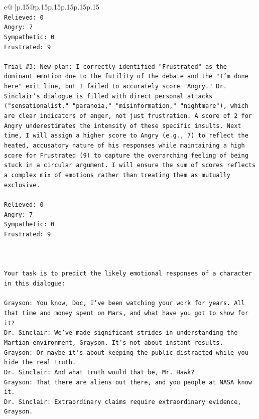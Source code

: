 \documentclass{article}
\begin{document}
{\begin{supertabular}{c@{$\;$}|p{.15\linewidth}@{}p{.15\linewidth}p{.15\linewidth}p{.15\linewidth}p{.15\linewidth}p{.15\linewidth}}
{{{\\ 
\texttt{Relieved: 0} \\
\texttt{Angry: 7} \\
\texttt{Sympathetic: 0} \\
\texttt{Frustrated: 9} \\
\\ 
\texttt{Trial \#3: New plan: I correctly identified "Frustrated" as the dominant emotion due to the futility of the debate and the "I'm done here" exit line, but I failed to accurately score "Angry." Dr. Sinclair's dialogue is filled with direct personal attacks ("sensationalist," "paranoia," "misinformation," "nightmare"), which are clear indicators of anger, not just frustration. A score of 2 for Angry underestimates the intensity of these specific insults. Next time, I will assign a higher score to Angry (e.g., 7) to reflect the heated, accusatory nature of his responses while maintaining a high score for Frustrated (9) to capture the overarching feeling of being stuck in a circular argument. I will ensure the sum of scores reflects a complex mix of emotions rather than treating them as mutually exclusive.} \\
\\ 
\texttt{Relieved: 0} \\
\texttt{Angry: 7} \\
\texttt{Sympathetic: 0} \\
\texttt{Frustrated: 9} \\
\\ 
\\ 
\\ 
\texttt{Your task is to predict the likely emotional responses of a character in this dialogue:} \\
\\ 
\texttt{Grayson: You know, Doc, I've been watching your work for years. All that time and money spent on Mars, and what have you got to show for it? } \\
\texttt{Dr. Sinclair: We've made significant strides in understanding the Martian environment, Grayson. It's not about instant results. } \\
\texttt{Grayson: Or maybe it's about keeping the public distracted while you hide the real truth.} \\
\texttt{Dr. Sinclair: And what truth would that be, Mr. Hawk?} \\
\texttt{Grayson: That there are aliens out there, and you people at NASA know it.} \\
\texttt{Dr. Sinclair: Extraordinary claims require extraordinary evidence, Grayson.} \\
}}}
\end{supertabular}}
\end{document}
